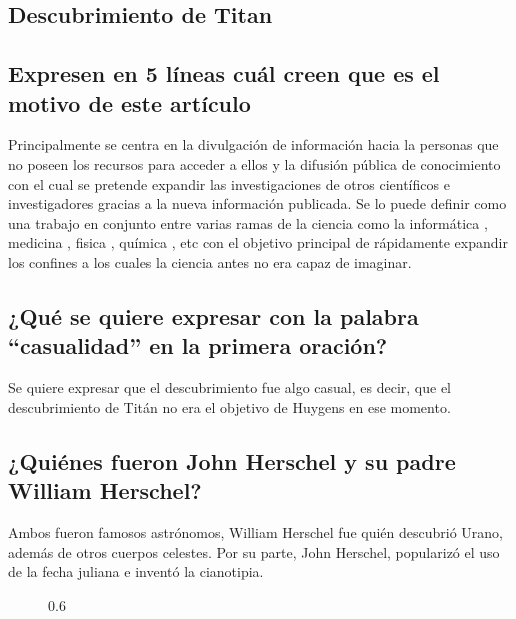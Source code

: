 \documentclass[11pt]{article}
\begin{document}
\begin{multicols}{2}

\section{Descubrimiento de Titan}

\subsection{Expresen en 5 líneas cuál creen que es el motivo de este artículo}

Principalmente se centra en la divulgación de información hacia la personas que no poseen los recursos para acceder a ellos y la difusión pública de conocimiento con el cual se pretende expandir las investigaciones de otros científicos e investigadores gracias a la nueva información publicada. Se lo puede definir como una trabajo en conjunto entre varias ramas de la ciencia como la informática , medicina , fisica , química , etc con el objetivo principal de rápidamente expandir los confines a los cuales la ciencia antes no era capaz de imaginar. 
   
\subsection{¿Qué se quiere expresar con la palabra “casualidad” en la primera oración?}
   
Se quiere expresar que el descubrimiento fue algo casual, es decir, que el descubrimiento de Titán no era el objetivo de Huygens en ese momento.

\subsection{¿Quiénes fueron John Herschel y su padre William Herschel?}
  
  Ambos fueron famosos astrónomos, William Herschel fue quién descubrió Urano, además de otros cuerpos celestes. Por su parte, John Herschel, popularizó el uso de la fecha juliana e inventó la cianotipia. \cite{william}\cite{john}
  
\begin{figure}{0.6\linewidth}
  

\end{figure}
\end{multicols}
\end{document}
